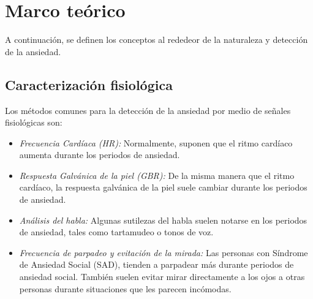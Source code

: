 \documentclass[letterpaper,12pt]{cicese}
\begin{document}
		\chapter{Marco te\'orico} 
			A continuaci\'on, se definen los conceptos al rededeor de la naturaleza y detecci\'on de la ansiedad.
				
			\section{Caracterizaci\'on fisiol\'ogica}
				Los m\'etodos comunes para la detecci\'on de la ansiedad  por medio de se\~nales fisiol\'ogicas son: 
					\begin{itemize}
						\item \emph{Frecuencia Card\'iaca (HR):} Normalmente, suponen que el ritmo card\'iaco aumenta durante los periodos de ansiedad. 
						\item \emph{Respuesta Galv\'anica de la piel (GBR):} De la misma manera que el ritmo card\'iaco, la respuesta galv\'anica de la piel suele cambiar durante los periodos de ansiedad.
						\item \emph{An\'alisis del habla:} Algunas sutilezas del habla suelen notarse en los periodos de ansiedad, tales como tartamudeo o tonos de voz.
						\item \emph{Frecuencia de parpadeo y evitaci\'on de la mirada:} Las personas con S\'indrome de Ansiedad Social (SAD), tienden a parpadear m\'as durante periodos de ansiedad social. Tambi\'en suelen evitar mirar directamente a los ojos a otras personas durante situaciones que les parecen inc\'omodas\citep{Kwon2009}. 
					\end{itemize}
\end{document}
